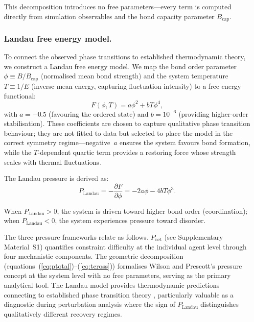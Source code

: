 \documentclass[12pt]{article}
\begin{document}
This decomposition introduces no free parameters---every term is computed directly from simulation observables and the bond capacity parameter $B_\mathrm{cap}$.


\subsubsection{Landau free energy model.}

To connect the observed phase transitions to established thermodynamic theory, we construct a Landau free energy model. We map the bond order parameter $\phi \equiv B/B_\mathrm{cap}$ (normalised mean bond strength) and the system temperature $T \equiv 1/E$ (inverse mean energy, capturing fluctuation intensity) to a free energy functional:
\begin{equation}
F(\phi, T) = a\phi^2 + bT\phi^4,
\label{eq:landau}
\end{equation}
with $a = -0.5$ (favouring the ordered state) and $b = 10^{-6}$ (providing higher-order stabilisation). These coefficients are chosen to capture qualitative phase transition behaviour; they are not fitted to data but selected to place the model in the correct symmetry regime---negative~$a$ ensures the system favours bond formation, while the $T$-dependent quartic term provides a restoring force whose strength scales with thermal fluctuations.

The Landau pressure is derived as:
\begin{equation}
P_\mathrm{Landau} = -\frac{\partial F}{\partial \phi} = -2a\phi - 4bT\phi^3.
\label{eq:plandau}
\end{equation}

When $P_\mathrm{Landau} > 0$, the system is driven toward higher bond order (coordination); when $P_\mathrm{Landau} < 0$, the system experiences pressure toward disorder.

The three pressure frameworks relate as follows. $P_\mathrm{net}$ (see Supplementary Material~S1) quantifies constraint difficulty at the individual agent level through four mechanistic components. The geometric decomposition (equations~(\ref{eq:ptotal})--(\ref{eq:tcross})) formalises Wilson and Prescott's pressure concept at the system level with no free parameters, serving as the primary analytical tool. The Landau model provides thermodynamic predictions connecting to established phase transition theory \cite{landau1980}, particularly valuable as a diagnostic during perturbation analysis where the sign of $P_\mathrm{Landau}$ distinguishes qualitatively different recovery regimes.
\end{document}
